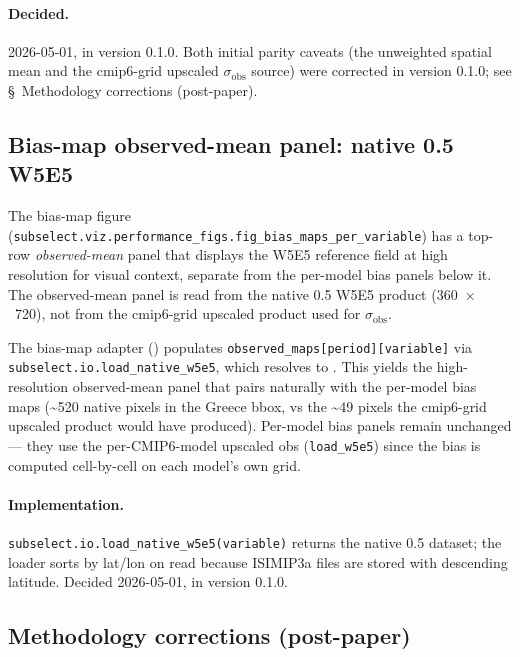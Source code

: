 \documentclass[11pt,a4paper]{article}
\begin{document}
\paragraph{Decided.} 2026-05-01, in version 0.1.0. Both initial parity
caveats (the unweighted spatial mean and the cmip6-grid upscaled
$\sigma_{\text{obs}}$ source) were corrected in version 0.1.0; see
\S\ Methodology corrections (post-paper).

\subsection{Bias-map observed-mean panel: native 0.5\textdegree{} W5E5}\label{sec:performance-bias-map-obs}

The bias-map figure
(\texttt{subselect.viz.performance\_figs.fig\_bias\_maps\_per\_variable})
has a top-row \emph{observed-mean} panel that displays the W5E5
reference field at high resolution for visual context, separate from
the per-model bias panels below it. The observed-mean panel is read
from the native 0.5\textdegree{} W5E5 product (360~$\times$~720), not
from the cmip6-grid upscaled product used for $\sigma_{\text{obs}}$.

The bias-map adapter
()
populates \texttt{observed\_maps[period][variable]} via
\texttt{subselect.io.load\_native\_w5e5}, which resolves to
. This yields
the high-resolution observed-mean panel that pairs naturally with the
per-model bias maps (\textasciitilde 520 native pixels in the Greece
bbox, vs the \textasciitilde 49 pixels the cmip6-grid upscaled product
would have produced). Per-model bias panels remain unchanged --- they
use the per-CMIP6-model upscaled obs (\texttt{load\_w5e5}) since the
bias is computed cell-by-cell on each model's own grid.

\paragraph{Implementation.}
\texttt{subselect.io.load\_native\_w5e5(variable)} returns the native
0.5\textdegree{} dataset; the loader sorts by lat/lon on read because
ISIMIP3a files are stored with descending latitude. Decided 2026-05-01,
in version 0.1.0.

\subsection{Methodology corrections (post-paper)}\label{sec:performance-corrections}
\end{document}
